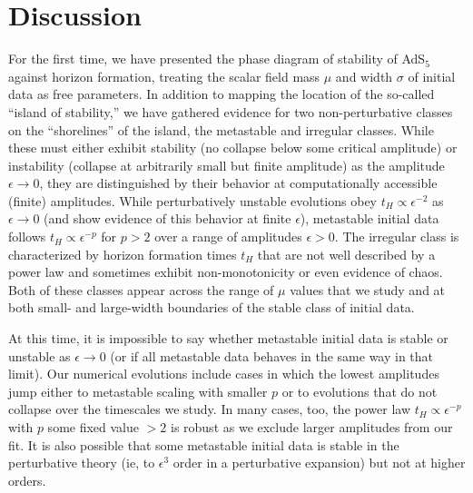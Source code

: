 \documentclass[../PhD.tex]{subfiles}
\begin{document}

\section{Discussion}

For the first time,
we have presented the phase diagram of stability of AdS$_5$ against horizon
formation, treating the scalar field mass $\mu$ and width $\sigma$ of initial
data as free parameters.  In addition to mapping the location of the so-called
``island of stability,'' we have gathered evidence for two non-perturbative
classes on the ``shorelines'' of the island, the metastable and irregular 
classes.
While these must either exhibit stability (no collapse below some critical
amplitude) or instability (collapse at arbitrarily small but finite amplitude)
as the amplitude $\epsilon\to 0$, they are distinguished by their behavior
at computationally accessible (finite) amplitudes.  
While perturbatively unstable
evolutions obey $t_H\propto\epsilon^{-2}$ as $\epsilon\to 0$ (and show
evidence of this behavior at finite $\epsilon$), metastable
initial data follows $t_H\propto\epsilon^{-p}$ for $p>2$ over a range of
amplitudes $\epsilon>0$. 
The irregular class is characterized by horizon formation times
$t_H$ that are not well described by a power law and sometimes exhibit
non-monotonicity or even evidence of chaos.  
Both of these classes appear across the range
of $\mu$ values that we study and at both small- and large-width boundaries
of the stable class of initial data.

At this time, it is impossible to say whether metastable initial data is
stable or unstable as $\epsilon\to 0$ (or if all metastable data behaves in the
same way in that limit).  Our numerical evolutions include cases in which
the lowest amplitudes jump either to metastable scaling with smaller $p$
or to evolutions that do not collapse over the timescales we study.
In many cases, too, the power law $t_H\propto\epsilon^{-p}$ with $p$ some
fixed value $>2$ is robust as we exclude larger amplitudes from our fit.
It is also possible that some metastable initial data is stable in the
perturbative theory (ie, to $\epsilon^3$ order in a perturbative expansion)
but not at higher orders.
\end{document}
